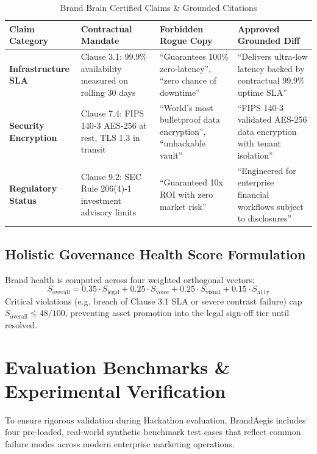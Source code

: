 \documentclass[10pt,a4paper]{article}
\begin{document}
\begin{table}[h]
\centering
\footnotesize
\caption{Brand Brain Certified Claims \& Grounded Citations}\label{tab:claim_registry}
\begin{tabularx}{\textwidth}{p{3.0cm}p{3.4cm}p{4.2cm}X}
\toprule
\textbf{Claim Category} & \textbf{Contractual Mandate} & \textbf{Forbidden Rogue Copy} & \textbf{Approved Grounded Diff} \\
\midrule
\textbf{Infrastructure SLA} & Clause 3.1: 99.9\% availability measured on rolling 30 days & ``Guarantees 100\% zero-latency'', ``zero chance of downtime'' & ``Delivers ultra-low latency backed by contractual 99.9\% uptime SLA'' \\
\addlinespace[0.08cm]
\textbf{Security Encryption} & Clause 7.4: FIPS 140-3 AES-256 at rest, TLS 1.3 in transit & ``World's most bulletproof data encryption'', ``unhackable vault'' & ``FIPS 140-3 validated AES-256 data encryption with tenant isolation'' \\
\addlinespace[0.08cm]
\textbf{Regulatory Status} & Clause 9.2: SEC Rule 206(4)-1 investment advisory limits & ``Guaranteed 10x ROI with zero market risk'' & ``Engineered for enterprise financial workflows subject to disclosures'' \\
\bottomrule
\end{tabularx}
\end{table}

\vspace{-0.3cm}
\subsection{Holistic Governance Health Score Formulation}
Brand health is computed across four weighted orthogonal vectors:
\begin{equation}
S_{\text{overall}} = 0.35 \cdot S_{\text{legal}} + 0.25 \cdot S_{\text{voice}} + 0.25 \cdot S_{\text{visual}} + 0.15 \cdot S_{\text{a11y}}
\end{equation}
Critical violations (e.g. breach of Clause 3.1 SLA or severe contrast failure) cap $S_{\text{overall}} \le 48/100$, preventing asset promotion into the legal sign-off tier until resolved.

\newpage

\section{Evaluation Benchmarks \& Experimental Verification}
To ensure rigorous validation during Hackathon evaluation, BrandAegis includes four pre-loaded, real-world synthetic benchmark test cases that reflect common failure modes across modern enterprise marketing operations.
\end{document}
